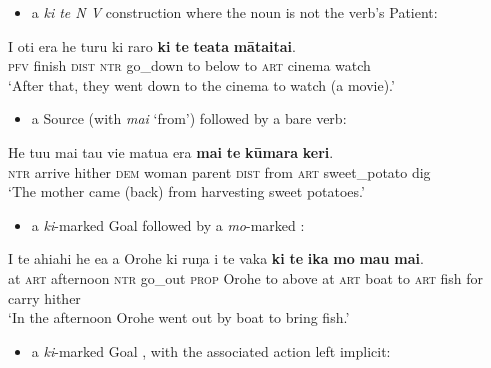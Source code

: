 \begin{itemize}
\item
a \textit{ki te N V} construction where the noun is not the verb’s Patient:
\end{itemize}

\ea\label{ex:11.249}
\gll I oti era he turu ki raro \textbf{ki} \textbf{te} \textbf{teata} \textbf{māta{\ꞌ}ita{\ꞌ}i}. \\
\textsc{pfv} finish \textsc{dist} \textsc{ntr} go\_down to below to \textsc{art} cinema watch \\

\glt
‘After that, they went down to the cinema to watch (a movie).’ \textstyleExampleref{[R210.145]} 
\z

\begin{itemize}
\item 
a Source  (with  \textit{mai} ‘from’) followed by a bare verb:
\end{itemize}

\ea\label{ex:11.250}
\gll He tu{\ꞌ}u mai tau vi{\ꞌ}e matu{\ꞌ}a era \textbf{mai} \textbf{te} \textbf{kūmara} \textbf{keri}. \\
\textsc{ntr} arrive hither \textsc{dem} woman parent \textsc{dist} from \textsc{art} sweet\_potato dig \\

\glt
‘The mother came (back) from harvesting sweet potatoes.’ \textstyleExampleref{[MsE-094.006]}
\z

\begin{itemize}
\item 
a \textit{ki}{}-marked Goal  followed by a \textit{mo}{}-marked :
\end{itemize}

\ea\label{ex:11.251}
\gll {\ꞌ}I te ahiahi he e{\ꞌ}a a {\ꞌ}Orohe ki ruŋa i te vaka  \textbf{ki} \textbf{te} \textbf{ika} \textbf{mo} \textbf{ma{\ꞌ}u} \textbf{mai}.\\
at \textsc{art} afternoon \textsc{ntr} go\_out \textsc{prop} Orohe to above at \textsc{art} boat  to \textsc{art} fish for carry hither\\

\glt
‘In the afternoon Orohe went out by boat to bring fish.’ \textstyleExampleref{[R160.005]} 
\z

\begin{itemize}
\item 
a \textit{ki}{}-marked Goal , with the associated action left implicit:
\end{itemize}

